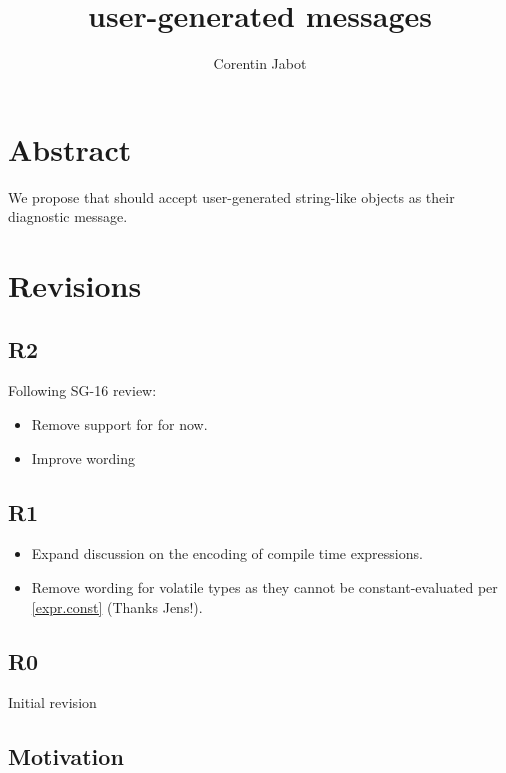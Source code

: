\documentclass{wg21}
\title{user-generated \tcode{static\_assert} messages}
\author{Corentin Jabot}{corentin.jabot@gmail.com}
\begin{document}
\maketitle

\section{Abstract}

We propose that  should accept user-generated string-like objects as their diagnostic message.

\section{Revisions}

\subsection{R2}

Following SG-16 review:

\begin{itemize}
\item Remove support for  for now.
\item Improve wording
\end{itemize}

\subsection{R1}

\begin{itemize}
 \item Expand discussion on the encoding of compile time expressions.
 \item Remove wording for volatile types as they cannot be constant-evaluated per \href{https://eel.is/c++draft/expr.const#5.9}{[expr.const]} (Thanks Jens!).
\end{itemize}


\subsection{R0}

Initial revision

\subsection{Motivation}
\end{document}
